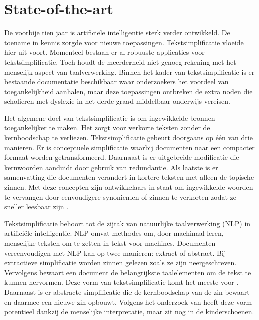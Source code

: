 

\section{State-of-the-art}%
\label{sec:state-of-the-art}

De voorbije tien jaar is artificiële intelligentie sterk verder ontwikkeld. De toename in kennis zorgde voor nieuwe toepassingen. Tekstsimplificatie vloeide hier uit voort. Momenteel bestaan er al robuuste applicaties voor tekstsimplificatie. Toch houdt de meerderheid niet genoeg rekening met het menselijk aspect van taalverwerking. Binnen het kader van tekstsimplificatie is er bestaande documentatie beschikbaar waar onderzoekers het voordeel van toegankelijkheid aanhalen, maar deze toepassingen ontbreken de extra noden die scholieren met dyslexie in het derde graad middelbaar onderwijs vereisen.

Het algemene doel van tekstsimplificatie is om ingewikkelde bronnen toegankelijker te maken. Het zorgt voor verkorte teksten zonder de kernboodschap te verliezen. Tekstsimplificatie \newline gebeurt doorgaans op één van drie manieren. Er is conceptuele simplificatie waarbij documenten naar een compacter formaat worden getransformeerd. Daarnaast is er uitgebreide modificatie die kernwoorden aanduidt door gebruik van redundantie. Als laatste is er samenvatting die documenten verandert in kortere teksten met alleen de topische zinnen. Met deze concepten zijn ontwikkelaars in staat om ingewikkelde woorden te vervangen door eenvoudigere synoniemen of zinnen te verkorten zodat ze sneller leesbaar zijn \autocite{Siddharthan2014}.

Tekstsimplificatie behoort tot de zijtak van natuurlijke taalverwerking (NLP) in artificiële intelligentie. NLP omvat methodes om, door machinaal leren, menselijke teksten om te zetten in tekst voor machines. Documenten vereenvoudigen met NLP kan op twee manieren: extract of abstract. Bij extractieve simplificatie worden zinnen gelezen zoals ze zijn neergeschreven. Vervolgens bewaart een document de belangrijkste taalelementen om de tekst te kunnen hervormen. Deze vorm van tekstsimplificatie komt het meeste voor \autocite{Sciforce2020}. Daarnaast is er abstracte simplificatie die de kernboodschap van de zin bewaart en daarmee een nieuwe zin opbouwt. Volgens het onderzoek van \textcite{Chowdhary2020} heeft deze vorm potentieel dankzij de menselijke interpretatie, maar zit nog in de kinderschoenen.

